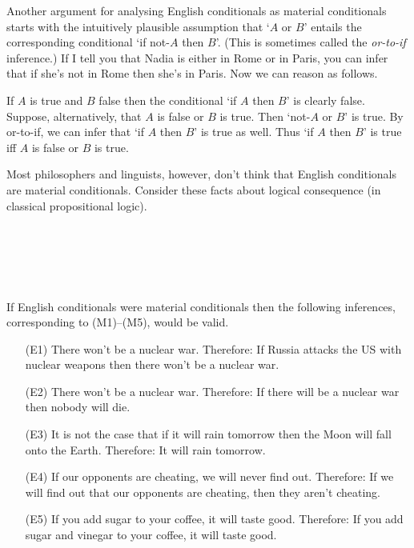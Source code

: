 Another argument for analysing English conditionals as material conditionals
starts with the intuitively plausible assumption that `$A$ or $B$' entails the
corresponding conditional `if not-$A$ then $B$'. (This is sometimes called the
\emph{or-to-if} inference.) If I tell you that Nadia is either in Rome or in
Paris, you can infer that if she's not in Rome then she's in Paris. Now we can
reason as follows.

If $A$ is true and $B$ false then the conditional `if $A$ then $B$' is clearly
false. Suppose, alternatively, that $A$ is false or $B$ is true. Then `not-$A$
or $B$' is true. By or-to-if, we can infer that `if $A$ then $B$' is true as
well. Thus `if $A$ then $B$' is true iff $A$ is false or $B$ is true.

Most philosophers and linguists, however, don't think that English conditionals
are material conditionals. Consider these facts about logical consequence (in
classical propositional logic).
%
\begin{principles}\label{paradoxes-mat-imp}
\\
\\
\\
\\
\end{principles}

If English conditionals were material conditionals then the following
inferences, corresponding to (M1)--(M5), would be valid.

\begin{enumerate}[leftmargin=12mm]
  \itemsep1mm
  \item[(E1)] There won't be a nuclear war. Therefore: If Russia attacks the US
        with nuclear weapons then there won't be a nuclear war.
  \item[(E2)] There won't be a nuclear war. Therefore: If there will be a
        nuclear war then nobody will die.
  \item[(E3)] It is not the case that if it will rain tomorrow then the Moon
        will fall onto the Earth. Therefore: It will rain tomorrow.
  \item[(E4)] If our opponents are cheating, we will never find out. Therefore:
        If we will find out that our opponents are cheating, then they aren't
        cheating.
  \item[(E5)] If you add sugar to your coffee, it will taste good. Therefore: If
        you add sugar and vinegar to your coffee, it will taste good.
\end{enumerate}

